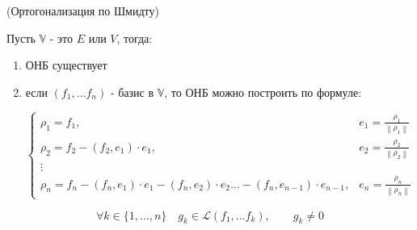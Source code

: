 \begin{shth}
    \begin{theorem}
        (Ортогонализация по Шмидту)
        
        Пусть $\mathbb{V}$ - это $E$ или $V$, тогда:
        \begin{enumerate}
            \item ОНБ существует
            \item если ${(f_{1}, \ldots f_{n})}$ - базис в $\mathbb{V}$, то ОНБ можно построить по формуле:
            
            \[
            \begin{cases}
                \rho_{1} = f_{1}, & e_{1} = \frac{\rho_{1}}{\left\|\rho_{1}\right\|} \\
                \rho_{2} = f_{2} - \left(f_{2}, e_{1}\right) \cdot e_{1}, & e_{2} = \frac{\rho_{2}}{\left\|\rho_{2}\right\|} \\
                \vdots \\
                \rho_{n} = f_{n} - \left(f_{n}, e_{1}\right) \cdot e_{1} - \left(f_{n}, e_{2}\right) \cdot e_{2} \ldots - \left(f_{n}, e_{n-1}\right) \cdot e_{n-1}, & e_{n} = \frac{\rho_{n}}{\left\|\rho_{n}\right\|}
            \end{cases}
            \]
        \end{enumerate}
    \end{theorem}
\end{shth}

\clearpage

\begin{shth}
    \begin{lemma}
        \[ \forall k \in {\{1, \ldots, n \}} \quad g_{k} \in \mathcal{L}(f_{1}, \ldots f_{k}), \qquad g_{k} \neq 0 \]
    \end{lemma}
\end{shth}

